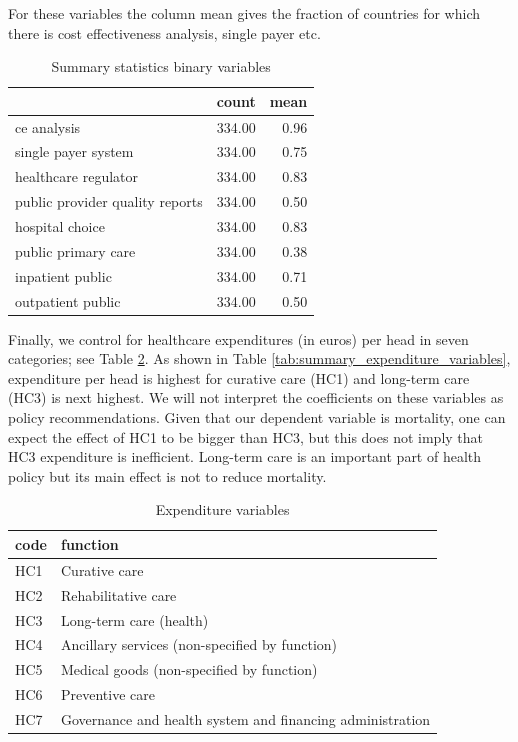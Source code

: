 \documentclass[a4paper,12pt]{article}
\begin{document}
For these variables the column mean gives the fraction of countries for which there is cost effectiveness analysis, single payer etc.

\begin{table}[htbp]
\caption{\label{tab:summary_policy_variables}Summary statistics binary variables}
\centering
\begin{tabular}{lrr}
 & count & mean\\
\hline
ce analysis & 334.00 & 0.96\\
single payer system & 334.00 & 0.75\\
healthcare regulator & 334.00 & 0.83\\
public provider quality reports & 334.00 & 0.50\\
hospital choice & 334.00 & 0.83\\
public primary care & 334.00 & 0.38\\
inpatient public & 334.00 & 0.71\\
outpatient public & 334.00 & 0.50\\
\end{tabular}
\end{table}


Finally, we control for healthcare expenditures (in euros) per head in seven categories; see Table \ref{tab:expenditure_labels}. As shown in Table \ref{tab:summary_expenditure_variables}, expenditure per head is highest for curative care (HC1) and long-term care (HC3) is next highest. We will not interpret the coefficients on these variables as policy recommendations. Given that our dependent variable is mortality, one can expect the effect of HC1 to be bigger than HC3, but this does not imply that HC3 expenditure is inefficient. Long-term care is an important part of health policy but its main effect is not to reduce mortality.

\begin{table}[htbp]
\caption{\label{tab:expenditure_labels}Expenditure variables}
\centering
\begin{tabular}{ll}
code & function\\
\hline
HC1 & Curative care\\
HC2 & Rehabilitative care\\
HC3 & Long-term care (health)\\
HC4 & Ancillary services (non-specified by function)\\
HC5 & Medical goods (non-specified by function)\\
HC6 & Preventive care\\
HC7 & Governance and health system and financing administration\\
\end{tabular}
\end{table}
\end{document}
